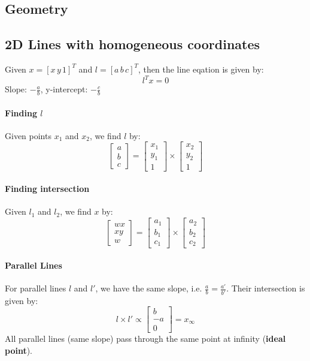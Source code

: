\documentclass[8pt, a4paper, landscape, includeheadfoot]{extarticle}
\begin{document}
\begin{multicols*}{4}
	\section{Geometry}
	\subsection{2D Lines with homogeneous coordinates}

	Given $ x = [x \, y \, 1]^T$ and $l = [a  \, b  \, c]^T$, then the line eqation is given by:
	$$
		l^T x = 0
	$$
	Slope: $-\frac{a}{b}$, y-intercept: $-\frac{c}{b}$
	\paragraph{Finding $l$}
	Given points $x_1$ and $x_2$, we find $l$ by:
	$$
		\begin{bmatrix}
			a \\ b \\ c
		\end{bmatrix} = \begin{bmatrix}
			x_1 \\ y_1 \\ 1
		\end{bmatrix} \times \begin{bmatrix}
			x_2 \\ y_2 \\ 1
		\end{bmatrix}
	$$
	\paragraph{Finding intersection}
	Given $l_1$ and $l_2$, we find $x$ by:
	$$
		\begin{bmatrix}
			wx \\ xy \\ w
		\end{bmatrix} = \begin{bmatrix}
			a_1 \\ b_1 \\ c_1
		\end{bmatrix} \times \begin{bmatrix}
			a_2 \\ b_2 \\ c_2
		\end{bmatrix}
	$$
	\paragraph{Parallel Lines}For parallel lines $l$ and $l'$, we have the same slope, i.e. $\frac{a}{b} = \frac{a'}{b'}$. Their intersection is given by:
	$$
		l \times l' \propto \begin{bmatrix}
			b \\ -a \\ 0
		\end{bmatrix} = x_\infty
	$$
	All parallel lines (same slope) pass through the same point at infinity (\textbf{ideal point}).



\end{multicols*}
\end{document}
